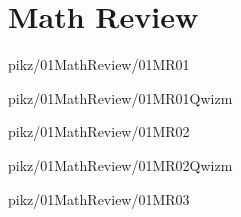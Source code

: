 \documentclass[9pt,xcolor={svgnames, x11names}]{beamer}
\begin{document}

%   


\section{Math Review}


\begin{frame}{pikz/01MathReview/01MR01}
	\resizebox{0.75\textwidth}{!}{%
		
	}
\end{frame}


\begin{frame}{pikz/01MathReview/01MR01Qwizm}
	\resizebox{0.75\textwidth}{!}{%
		
	}
\end{frame}


\begin{frame}{pikz/01MathReview/01MR02}
	\resizebox{0.75\textwidth}{!}{%
		
	}
\end{frame}

\begin{frame}{pikz/01MathReview/01MR02Qwizm}
	\resizebox{0.75\textwidth}{!}{%
		
	}
\end{frame}



\begin{frame}{pikz/01MathReview/01MR03}
	
\end{frame}
\end{document}
